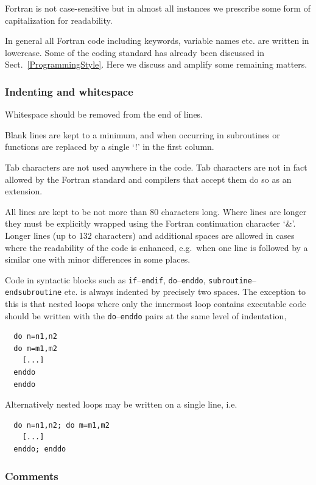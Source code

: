 \documentclass[\mydriver,12pt,twoside,notitlepage,a4paper]{article}
\newcommand{\code}[1]{\texttt{#1}}
\begin{document}
Fortran is not case-sensitive but in almost all instances we prescribe
some form of capitalization for readability.

In general all Fortran code including keywords, variable names etc. are
written in lowercase.
Some of the coding standard has already been discussed in 
Sect.~\ref{ProgrammingStyle}.
Here we discuss and amplify some remaining matters.

\subsubsection{Indenting and whitespace}

Whitespace should be removed from the end of lines.

Blank lines are kept to a minimum, and when occurring in subroutines
or functions are replaced by a single `!' in the first column.

Tab characters are not used anywhere in the code.  Tab characters are
not in fact allowed by the Fortran standard and compilers that accept
them do so as an extension.

All lines are kept to be not more than 80 characters long.
Where lines are longer they must be explicitly wrapped using the
Fortran continuation character `\&'.
Longer lines (up to 132 characters) and additional spaces are allowed
in cases where the readability of the code is enhanced, e.g.\ when one
line is followed by a similar one with minor differences in some places.

Code in syntactic blocks such as \code{if}--\code{endif}, \code{do}--\code{enddo},
\code{subroutine}--\code{endsubroutine} etc. is always indented by precisely two spaces.
The exception to this is that nested loops where only the innermost loop
contains executable code should be written with the \code{do}--\code{enddo}
pairs at the same level of indentation,
\begin{verbatim}
  do n=n1,n2
  do m=m1,m2
    [...]
  enddo
  enddo
\end{verbatim}
Alternatively nested loops may be written on a single line, i.e.
\begin{verbatim}
  do n=n1,n2; do m=m1,m2
    [...]
  enddo; enddo
\end{verbatim}

\subsubsection{Comments}
\end{document}
